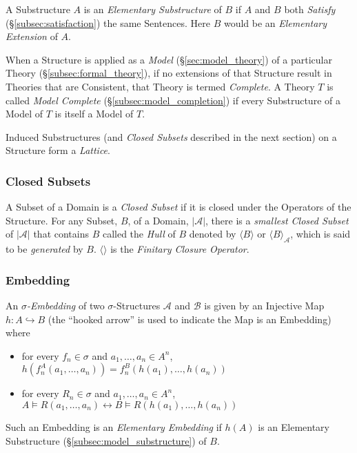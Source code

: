 \documentclass{article}
\begin{document}
A Substructure $A$ is an \emph{Elementary Substructure} of $B$ if $A$
and $B$ both \emph{Satisfy} (\S\ref{subsec:satisfaction}) the same
Sentences. Here $B$ would be an \emph{Elementary Extension} of $A$.

When a Structure is applied as a \emph{Model}
(\S\ref{sec:model_theory}) of a particular Theory
(\S\ref{subsec:formal_theory}), if no extensions of that Structure
result in Theories that are Consistent, that Theory is termed
\emph{Complete}. A Theory $T$ is called \emph{Model Complete}
(\S\ref{subsec:model_completion}) if every Substructure of a Model of
$T$ is itself a Model of $T$.

Induced Substructures (and \emph{Closed Subsets} described in the next
section) on a Structure form a \emph{Lattice}.

\subsubsection{Closed Subsets}

A Subset of a Domain is a \emph{Closed Subset} if it is closed under
the Operators of the Structure. For any Subset, $B$, of a Domain,
$|\mathcal{A}|$, there is a \emph{smallest Closed Subset} of
$|\mathcal{A}|$ that contains $B$ called the \emph{Hull} of $B$
denoted by $\langle B \rangle$ or $\langle B \rangle_{\mathcal{A}}$,
which is said to be \emph{generated} by $B$. $\langle \rangle$ is the
\emph{Finitary Closure Operator}.

\subsubsection{Embedding}\label{subsec:sigma_embedding}

An \emph{$\sigma$-Embedding} of two $\sigma$-Structures $\mathcal{A}$
and $\mathcal{B}$ is given by an Injective Map $h: A \hookrightarrow
B$ (the ``hooked arrow'' is used to indicate the Map is an Embedding)
where
\begin{itemize}
\item for every $f_n \in \sigma$ and $a_1, \ldots, a_n \in A^n$,
  $h(f_{n}^A(a_1,\ldots,a_n)) = f_{n}^B(h(a_1),\ldots,h(a_n))$
\item for every $R_n \in \sigma$ and $a_1, \ldots, a_n \in A^n$, $A
  \vDash R(a_1, \ldots, a_n) \leftrightarrow B \vDash R(h(a_1),
  \ldots, h(a_n))$
\end{itemize}
Such an Embedding is an \emph{Elementary Embedding} if $h(A)$ is an
Elementary Substructure (\S\ref{subsec:model_substructure}) of $B$.
\end{document}
